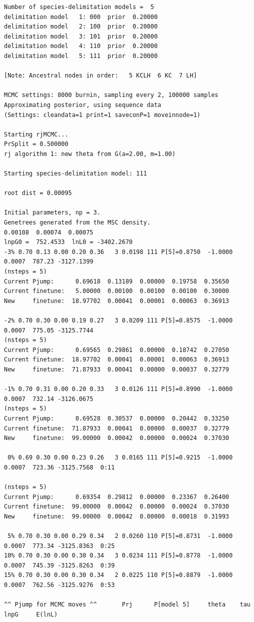 \documentclass{book}
\numberwithin{equation}{section} \renewcommand{\baselinestretch}{0.55}
\begin{document}
\begin{adjustwidth}{-100pt}{100pt}
{\small
\begin{verbatim}
Number of species-delimitation models =  5
delimitation model   1: 000  prior  0.20000
delimitation model   2: 100  prior  0.20000
delimitation model   3: 101  prior  0.20000
delimitation model   4: 110  prior  0.20000
delimitation model   5: 111  prior  0.20000

[Note: Ancestral nodes in order:   5 KCLH  6 KC  7 LH]

MCMC settings: 8000 burnin, sampling every 2, 100000 samples
Approximating posterior, using sequence data
(Settings: cleandata=1 print=1 saveconP=1 moveinnode=1)

Starting rjMCMC...
PrSplit = 0.500000
rj algorithm 1: new theta from G(a=2.00, m=1.00)

Starting species-delimitation model: 111

root dist = 0.00095

Initial parameters, np = 3.
Genetrees generated from the MSC density.
0.00108  0.00074  0.00075
lnpG0 =  752.4533  lnL0 = -3402.2670
-3% 0.70 0.13 0.00 0.20 0.36   3 0.0198 111 P[5]=0.8750  -1.0000 0.0007  787.23 -3127.1399
(nsteps = 5)
Current Pjump:      0.69618  0.13189  0.00000  0.19758  0.35650
Current finetune:   5.00000  0.00100  0.00100  0.00100  0.30000
New     finetune:  18.97702  0.00041  0.00001  0.00063  0.36913

-2% 0.70 0.30 0.00 0.19 0.27   3 0.0209 111 P[5]=0.8575  -1.0000 0.0007  775.05 -3125.7744
(nsteps = 5)
Current Pjump:      0.69565  0.29861  0.00000  0.18742  0.27050
Current finetune:  18.97702  0.00041  0.00001  0.00063  0.36913
New     finetune:  71.87933  0.00041  0.00000  0.00037  0.32779

-1% 0.70 0.31 0.00 0.20 0.33   3 0.0126 111 P[5]=0.8990  -1.0000 0.0007  732.14 -3126.0675
(nsteps = 5)
Current Pjump:      0.69528  0.30537  0.00000  0.20442  0.33250
Current finetune:  71.87933  0.00041  0.00000  0.00037  0.32779
New     finetune:  99.00000  0.00042  0.00000  0.00024  0.37030

 0% 0.69 0.30 0.00 0.23 0.26   3 0.0165 111 P[5]=0.9215  -1.0000 0.0007  723.36 -3125.7568  0:11

(nsteps = 5)
Current Pjump:      0.69354  0.29812  0.00000  0.23367  0.26400
Current finetune:  99.00000  0.00042  0.00000  0.00024  0.37030
New     finetune:  99.00000  0.00042  0.00000  0.00018  0.31993

 5% 0.70 0.30 0.00 0.29 0.34   2 0.0260 110 P[5]=0.8731  -1.0000 0.0007  773.34 -3125.8363  0:25
10% 0.70 0.30 0.00 0.30 0.34   3 0.0234 111 P[5]=0.8778  -1.0000 0.0007  745.39 -3125.8263  0:39
15% 0.70 0.30 0.00 0.30 0.34   2 0.0225 110 P[5]=0.8879  -1.0000 0.0007  762.56 -3125.9276  0:53

^^ Pjump for MCMC moves ^^       Prj      P[model 5]     theta    tau   lnpG     E(lnL)
\end{verbatim}
}
\end{adjustwidth}
\end{document}
